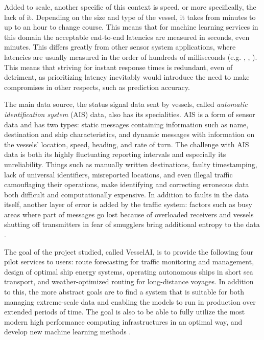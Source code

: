 Added to scale, another specific of this context is speed, or more specifically, the lack of it. Depending on the size and type of the vessel, it takes from minutes to up to an hour to change course. This means that for machine learning services in this domain the acceptable end-to-end latencies are measured in seconds, even minutes. This differs greatly from other sensor system applications, where latencies are usually measured in the order of hundreds of milliseconds (e.g. \cite{anomalysystem}, \cite{facebook}, \cite{edgelatency}). This means that striving for instant response times is redundant, even of detriment, as prioritizing latency inevitably would introduce the need to make compromises in other respects, such as prediction accuracy.

The main data source, the status signal data sent by vessels, called \textit{automatic identification system} (AIS) data, also has its specialities. AIS is a form of sensor data and has two types: static messages containing information such as name, destination and ship characteristics, and dynamic messages with information on the vessels' location, speed, heading, and rate of turn. The challenge with AIS data is both its highly fluctuating reporting intervals and especially its unreliability.  Things such as manually written destinations, faulty timestamping, lack of universal identifiers, misreported locations, and even illegal traffic camouflaging their operations, make identifying and correcting erroneous data both difficult and computationally expensive. In addition to faults in the data itself, another layer of error is added by the traffic system: factors such as busy areas where part of messages go lost because of overloaded receivers and vessels shutting off transmitters in fear of smugglers bring additional entropy to the data \cite{maritimeinformatics}.

The goal of the project studied, called VesselAI, is to provide the following four pilot services to users: route forecasting for traffic monitoring and management, design of optimal ship energy systems, operating autonomous ships in short sea transport, and weather-optimized routing for long-distance voyages. In addition to this, the more abstract goals are to find a system that is suitable for both managing extreme-scale data and enabling the models to run in production over extended periods of time. The goal is also to be able to fully utilize the most modern high performance computing infrastructures in an optimal way, and develop new machine learning methods \cite{D1.1}.

